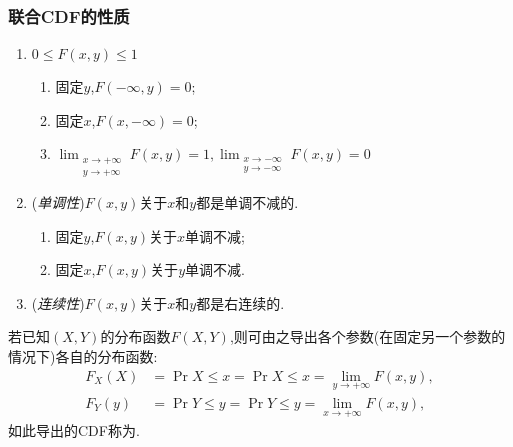 \subsubsection{联合CDF的性质}
\begin{enumerate}
    \item $0\leq F(x,y )\leq 1$
          \begin{enumerate}
              \item 固定$y$,$F(-\infty,y ) = 0$;
              \item 固定$x$,$F(x,-\infty) = 0$;
              \item $\lim_{\substack{x\to +\infty\\y\to +\infty}}F(x,y ) = 1, \lim_{\substack{x\to -\infty\\y\to -\infty}}F(x,y) = 0$
          \end{enumerate}
    \item (\textit{单调性})$F(x,y )$关于$x$和$y$都是单调不减的.
          \begin{enumerate}
              \item 固定$y$,$F(x,y )$关于$x$单调不减;
              \item 固定$x$,$F(x,y )$关于$y$单调不减.
          \end{enumerate}
    \item (\textit{连续性})$F(x,y )$关于$x$和$y$都是右连续的.
\end{enumerate}
若已知$(X,Y)$的分布函数$F(X,Y)$,则可由之导出各个参数(在固定另一个参数的情况下)各自的分布函数:
\begin{align}
    F_X(X) & = \Pr{X\leq x } =\Pr{X\leq x} = \lim_{y\to +\infty}F(x,y), \\
    F_Y(y) & = \Pr{Y\leq y } =\Pr{Y\leq y} = \lim_{x\to +\infty}F(x,y),
\end{align}
如此导出的CDF称为.